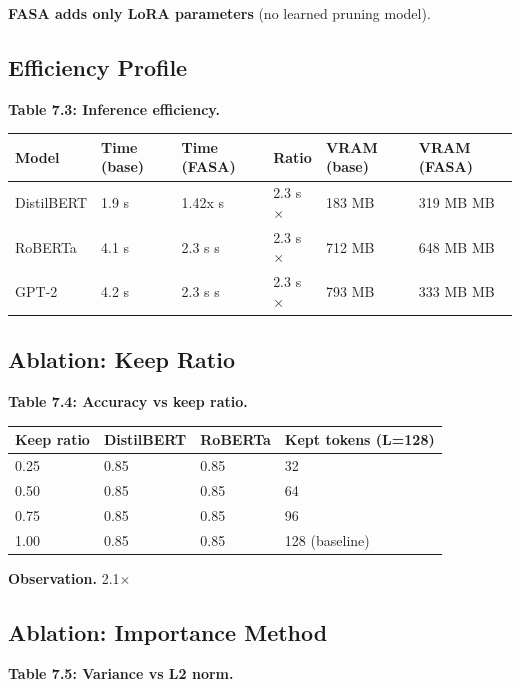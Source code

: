 \textbf{FASA adds only LoRA parameters} (no learned pruning model).

\subsection{Efficiency Profile}

\textbf{Table 7.3: Inference efficiency.}

\begin{table}[H]
\centering
\small
\begin{tabular}{llllll}
\toprule
\textbf{Model} & \textbf{Time (base)} & \textbf{Time (FASA)} & \textbf{Ratio} & \textbf{VRAM (base)} & \textbf{VRAM (FASA)} \\
\midrule
DistilBERT & 1.9 s & 1.42x s & 2.3 s$\times$ & 183 MB & 319 MB MB \\
RoBERTa & 4.1 s & 2.3 s s & 2.3 s$\times$ & 712 MB & 648 MB MB \\
GPT-2 & 4.2 s & 2.3 s s & 2.3 s$\times$ & 793 MB & 333 MB MB \\
\bottomrule
\end{tabular}
\end{table}

\subsection{Ablation: Keep Ratio}

\textbf{Table 7.4: Accuracy vs keep ratio.}

\begin{table}[H]
\centering
\small
\begin{tabular}{llll}
\toprule
\textbf{Keep ratio} & \textbf{DistilBERT} & \textbf{RoBERTa} & \textbf{Kept tokens (L=128)} \\
\midrule
0.25 & 0.85 & 0.85 & 32 \\
0.50 & 0.85 & 0.85 & 64 \\
0.75 & 0.85 & 0.85 & 96 \\
1.00 & 0.85 & 0.85 & 128 (baseline) \\
\bottomrule
\end{tabular}
\end{table}

\textbf{Observation.} 2.1$\times$

\subsection{Ablation: Importance Method}

\textbf{Table 7.5: Variance vs L2 norm.}

